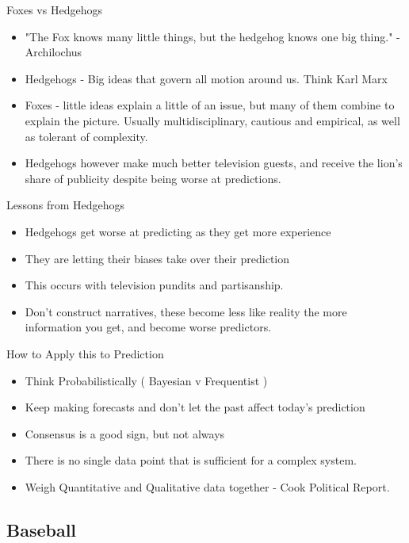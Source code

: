 \documentclass[bigger]{beamer}
\begin{document}
\begin{frame}[label=sec-2-2-3]{Foxes vs Hedgehogs}
\begin{itemize}
\item "The Fox knows many little things, but the hedgehog knows one big
thing." - Archilochus
\item Hedgehogs - Big ideas that govern all motion around us. Think Karl
Marx
\item Foxes - little ideas explain a little of an issue, but many of them
combine to explain the picture. Usually multidisciplinary, cautious
and empirical, as well as tolerant of complexity.
\item Hedgehogs however make much better television guests, and receive
the lion's share of publicity despite being worse at predictions.
\end{itemize}
\end{frame}

\begin{frame}[label=sec-2-2-4]{Lessons from Hedgehogs}
\begin{itemize}
\item Hedgehogs get worse at predicting as they get more experience
\item They are letting their biases take over their prediction
\item This occurs with television pundits and partisanship.
\item Don't construct narratives, these become less like reality the more
information you get, and become worse predictors.
\end{itemize}
\end{frame}

\begin{frame}[label=sec-2-2-5]{How to Apply this to Prediction}
\begin{itemize}
\item Think Probabilistically ( Bayesian v Frequentist )
\item Keep making forecasts and don't let the past affect today's prediction
\item Consensus is a good sign, but not always
\item There is no single data point that is sufficient for a complex
system.
\item Weigh Quantitative and Qualitative data together - Cook Political
Report.
\end{itemize}
\end{frame}

\subsection{Baseball}
\label{sec-2-3}
\end{document}
